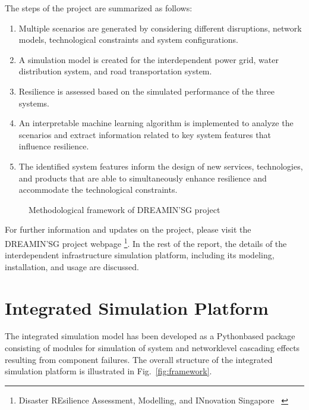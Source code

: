\documentclass[letterpaper,12pt,english]{sphinxmanual}
\begin{document}
The steps of the project are summarized as follows:
\begin{enumerate}[noitemsep]
	\item Multiple scenarios are generated by considering different disruptions, network models, technological constraints and system configurations. 
	\item A simulation model is created for the interdependent power grid, water distribution system, and road transportation system. 
	\item Resilience is assessed based on the simulated performance of the three systems. 
	\item An interpretable machine learning algorithm is implemented to analyze the scenarios and extract information related to key system features that influence resilience.
	\item The identified system features inform the design of new services, technologies, and products that are able to simultaneously enhance resilience and accommodate the technological constraints. 
\end{enumerate}

\begin{figure}[htbp]
	\centering
	\noindent{}
	\caption{Methodological framework of DREAMIN’SG project}\label{fig:method}
\end{figure}


For further information and updates on the project, please visit the
DREAMIN'SG project webpage \footnote{Disaster REsilience Assessment, Modelling, and INnovation Singapore  ~}. In the rest of the report, the details of the interdependent infrastructure simulation platform, including its modeling, installation, and usage are discussed.


\chapter{Integrated Simulation Platform}
\label{\detokenize{index:integrated-simulation-platform}}
\sphinxAtStartPar
The integrated simulation model has been developed as a Python\sphinxhyphen{}based package consisting of modules for simulation of system\sphinxhyphen{} and network\sphinxhyphen{}level
cascading effects resulting from component failures. The overall structure of the integrated simulation platform is illustrated in Fig.~\ref{fig:framework}.
\end{document}

